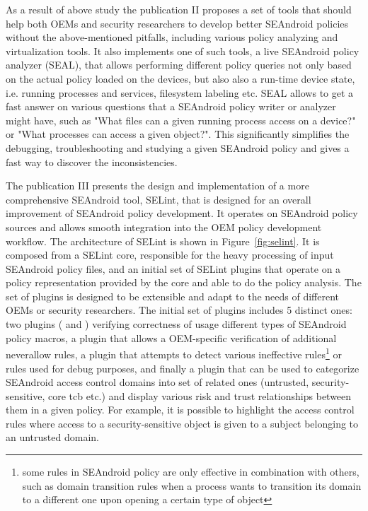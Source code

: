 
As a result of above study the publication II proposes a set of tools that should help both OEMs and security researchers to develop better SEAndroid policies without the above-mentioned pitfalls, including various policy analyzing and virtualization tools. It also implements one of such tools, a live SEAndroid policy analyzer (SEAL), that allows performing different policy queries not only based on the actual policy loaded on the devices, but also also a run-time device state, i.e. running processes and services, filesystem labeling etc. SEAL allows to get a fast answer on various questions that a SEAndroid policy writer or analyzer might have, such as "What files can a given running process access on a device?" or "What processes can access a given object?". This significantly simplifies the debugging, troubleshooting and studying a given SEAndroid policy and gives a fast way to discover the inconsistencies. 

The publication III presents the design and implementation of a more comprehensive SEAndroid tool, SELint, that is designed for an overall improvement of SEAndroid policy development. It operates on SEAndroid policy sources and allows smooth integration into the OEM policy development workflow. The architecture of SELint is shown in Figure~\ref{fig:selint}. It is composed from a SELint core, responsible for the heavy processing of input SEAndroid policy files, and an initial set of SELint plugins that operate on a policy representation provided by the core and able to do the policy analysis. The set of plugins is designed to be extensible and adapt to the needs of different OEMs or security researchers. The initial set of plugins includes 5 distinct ones: two plugins ( and ) verifying correctness of usage different types of SEAndroid policy macros, a  plugin that allows a OEM-specific verification of additional neverallow rules, a  plugin that attempts to detect various ineffective rules\footnote{some rules in SEAndroid policy are only effective in combination with others, such as domain transition rules when a process wants to transition its domain to a different one upon opening a certain type of object} or rules used for debug purposes, and finally a  plugin that can be used to categorize SEAndroid access control domains into set of related ones (untrusted, security-sensitive, core tcb etc.) and display various risk and trust relationships between them in a given policy. For example, it is possible to highlight the access control rules where access to a security-sensitive object is given to a subject belonging to an untrusted domain.


